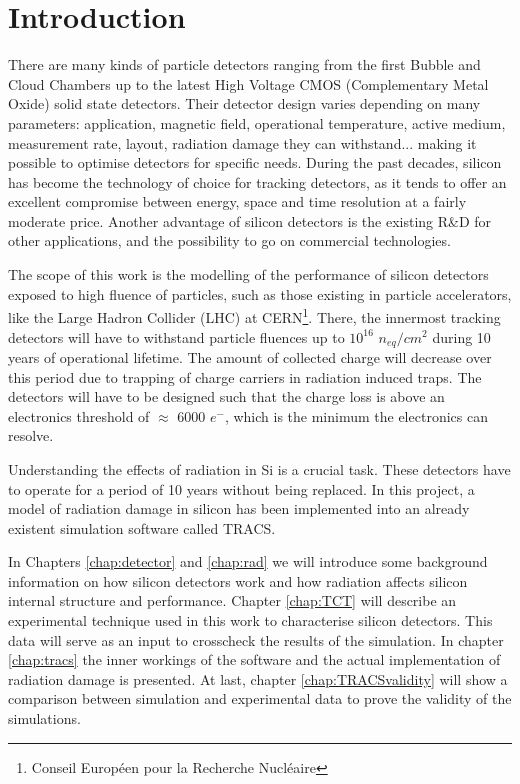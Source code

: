 \chapter{Introduction}

There are many kinds of particle detectors ranging from the first Bubble and Cloud Chambers up to the latest High Voltage CMOS (Complementary Metal Oxide) solid state detectors. Their detector design varies depending on many parameters: application, magnetic field, operational temperature, active medium, measurement rate, layout, radiation damage they can withstand... making it possible to optimise detectors for specific needs. During the past decades, silicon has become the technology of choice for tracking detectors, as it tends to offer an excellent compromise between energy, space and time resolution at a fairly moderate price. Another advantage of silicon detectors is the existing R\&D for other applications, and the possibility to go on commercial technologies.

 The scope of this work is the modelling of the performance of silicon detectors exposed to high fluence of particles, such as those existing in particle accelerators, like the Large Hadron Collider (LHC) at CERN\footnote{Conseil Européen pour la Recherche Nucléaire}. There, the innermost tracking detectors will have to withstand particle fluences up to $10^{16}$ $n_{eq}/cm^{2}$  during 10 years of operational lifetime. The amount of collected charge will decrease over this period due to trapping of charge carriers in radiation induced traps. The detectors will have to be designed such that the charge loss is above an electronics threshold of $\approx$ 6000 $e^{-}$, which is the minimum the electronics can resolve. 

 Understanding the effects of radiation in Si is a crucial task. These detectors have to operate for a period of 10 years without being replaced. In this project, a model of radiation damage in silicon has been implemented into an already existent simulation software called TRACS\cite{TRACS}. 
 
In Chapters \ref{chap:detector} and \ref{chap:rad} we will introduce some background information on how silicon detectors work and how radiation affects silicon internal structure and performance. Chapter \ref{chap:TCT} will describe an experimental technique used in this work to characterise silicon detectors. This data will serve as an input to crosscheck the results of the simulation. In chapter \ref{chap:tracs} the inner workings of the software and the actual implementation of radiation damage is presented. At last, chapter \ref{chap:TRACSvalidity} will show a comparison between simulation and experimental data to prove the validity of the simulations. 

